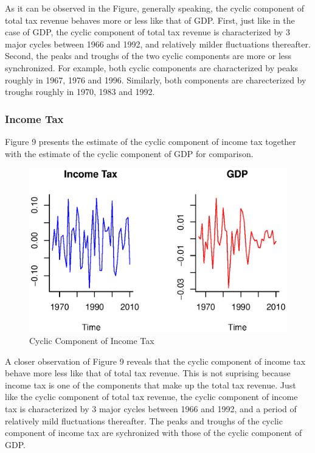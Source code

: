 \documentclass[12pt,a4paper,final]{article}
\begin{document}
As it can be observed in the Figure, generally speaking, the cyclic component of total tax revenue behaves more or less like that of GDP.  First, just like in the case of GDP, the cyclic component of total tax revenue is characterized by 3 major cycles between 1966 and 1992, and relatively milder fluctuations thereafter. Second, the peaks and troughs of the two cyclic components are more or less synchronized. For example, both cyclic components are characterized by peaks roughly in 1967, 1976 and 1996.  Similarly, both components are charecterized by troughs roughly in 1970, 1983 and 1992.

\newpage
\subsubsection{Income Tax}

Figure 9 presents the estimate of the cyclic component of income tax together with the estimate of the cyclic component of GDP for comparison.

\begin{figure}[ht]
\centering
\begin{small}
\caption{Cyclic Component of Income Tax}
\end{small}
\includegraphics[scale=0.601]{income_tax.eps} 
\end{figure}

A closer observation of Figure 9 reveals that the cyclic component of income tax behave more less like that of total tax revenue.  This is not suprising because income tax is one of the components that make up the total tax revenue. Just like the cyclic component of total tax revenue, the cyclic component of income tax is characterized by 3 major cycles between 1966 and 1992, and a period of relatively mild fluctuations thereafter. The peaks and troughs of the cyclic component of income tax are sychronized with those of the cyclic component of GDP.
\end{document}
